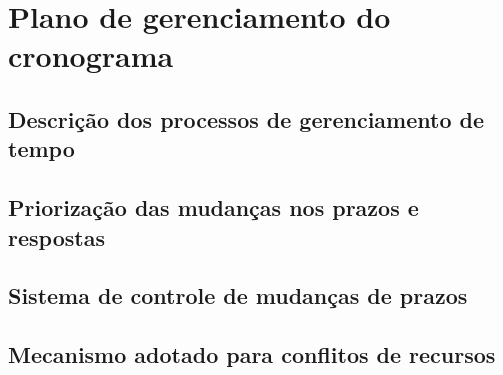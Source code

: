 
\chapter{Plano de gerenciamento do cronograma}


\section{Descrição dos processos de gerenciamento de tempo}

\begin{itemize}

\end{itemize}

\section{Priorização das mudanças nos prazos e respostas}

\section{Sistema de controle de mudanças de prazos}

\section{Mecanismo adotado para conflitos de recursos}

